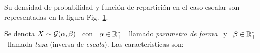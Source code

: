 Su densidad de probabilidad y funci\'on  de repartici\'on en el caso escalar son
representadas en la figura Fig.~\ref{Fig:MP:Gaussiana}.
%
\begin{figure}[h!]
\begin{center}  \end{center}
% 
\label{Fig:MP:Gaussiana}
\end{figure}





Se denota  $X \sim \mathcal{G}(\alpha,\beta)$  \ con \  $\alpha \in \mathbb{R}_+^*$  \ llamado
{\em  parametro de  forma} \  y \  $\beta \in  \mathbb{R}_+^*$ \  llamada  {\em taza}
(inversa de {\em escala}).  Las caracteristicas son:

